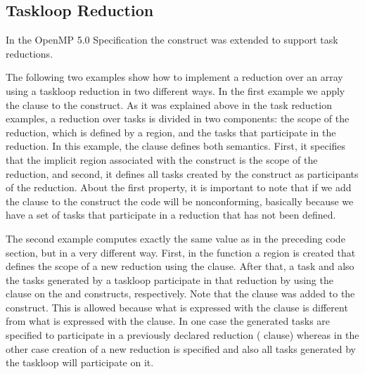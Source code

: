 


\subsection{Taskloop Reduction}
\label{subsec:taskloop_reduction}

In the OpenMP 5.0 Specification the  construct
was extended to support task reductions.

The following two examples show how to implement a reduction over an array
using a taskloop reduction in two different ways.
In the first
example we apply the  clause to the  construct. As it was
explained above in the task reduction examples, a reduction over tasks is
divided in two components: the scope of the reduction, which is defined by a
 region, and the tasks that participate in the reduction. In this
example, the  clause defines both semantics. First, it specifies that
the implicit  region associated with the  construct is the scope of the
reduction, and second, it defines all tasks created by the  construct as
participants of the reduction. About the first property, it is important to note
that if we add the  clause to the  construct the code will be
nonconforming, basically because we have a set of tasks that participate in a
reduction that has not been defined.


The second example computes exactly the same value as in the preceding  code section,
but in a very different way.
First, in the  function a  region is created 
that defines the scope of a new reduction using the  clause.
After that, a task and also the tasks generated by a taskloop participate in 
that reduction by using the  clause on the 
and  constructs, respectively. 
Note that the  clause was added to the  construct.
This is allowed because what is expressed with the  clause
is different from what is expressed with the  clause.
In one case the generated tasks are specified to participate in a previously 
declared reduction ( clause) whereas in the other case
creation of a new reduction is specified and also all tasks generated 
by the taskloop will participate on it.

